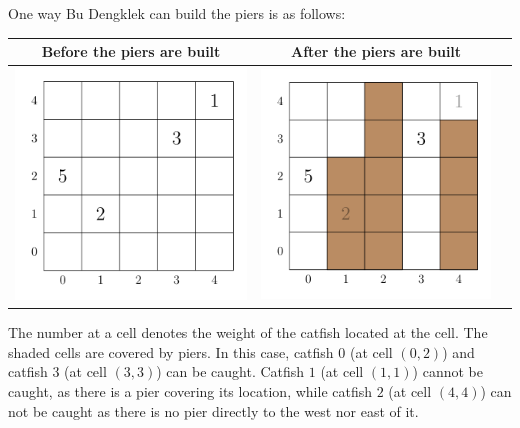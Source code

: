 One way Bu Dengklek can build the piers is as follows:
\begin{center}
\renewcommand{\arraystretch}{1.5}
\begin{tabular}{|c|c|c|}
\hline

 Before the piers are built &  After the piers are built \\
\hline
\includegraphics{fish-sample1-pond.png}   & \includegraphics{fish-sample1-pier.png}\\
\hline
\end{tabular}
\end{center}


The number at a cell denotes the weight of the catfish located at the cell.
The shaded cells are covered by piers.
In this case, catfish $0$ (at cell $(0, 2)$) and catfish $3$ (at cell $(3, 3)$) can be caught.
Catfish $1$ (at cell $(1, 1)$) cannot be caught, as there is a pier covering its location, while catfish $2$ (at cell $(4, 4)$) can not be caught as there is no pier directly to the west nor east of it.

